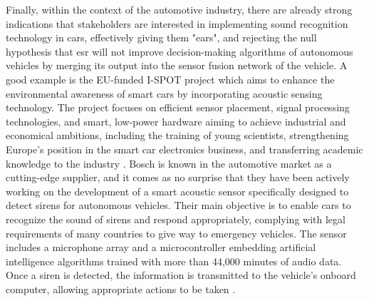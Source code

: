 Finally, within the context of the automotive industry, there are already strong indications that stakeholders are interested in implementing sound recognition technology in cars, effectively giving them "ears", and rejecting the null hypothesis that \gls{esr} will not improve decision-making
algorithms of autonomous vehicles by merging its output into the sensor fusion network of the vehicle. A good example is the EU-funded I-SPOT project which aims to enhance the environmental awareness of smart cars by incorporating acoustic sensing technology. The project focuses on efficient sensor placement, signal processing technologies, and smart, low-power hardware aiming to achieve industrial and economical ambitions, including the training of young scientists, strengthening Europe's position in the smart car electronics business, and transferring academic knowledge to the industry \cite{ISPOT2020}. Bosch is known in the automotive market as a cutting-edge supplier, and it comes as no surprise that they have been actively working on the development of a smart acoustic sensor specifically designed to detect sirens for autonomous vehicles. Their main objective is to enable cars to recognize the sound of sirens and respond appropriately, complying with legal requirements of many countries to give way to emergency vehicles. The sensor includes a microphone array and a microcontroller embedding artificial intelligence algorithms trained with more than 44,000 minutes of audio data. Once a siren is detected, the information is transmitted to the vehicle's onboard computer, allowing appropriate actions to be taken \cite{BOSCH2024}.

